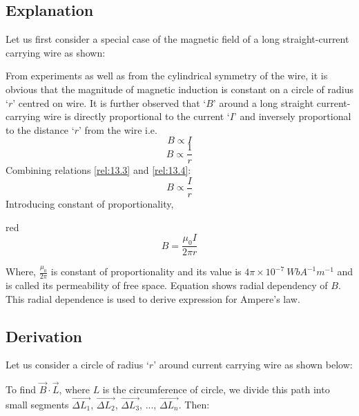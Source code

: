 \subsection*{Explanation}
Let us first consider a special case of the magnetic field of a
long straight-current carrying wire as shown:

From experiments as well as from the cylindrical symmetry of the wire, it is obvious that the magnitude of magnetic induction is constant on
a circle of radius ‘$r$’ centred on wire. It is further observed that ‘$B$’
around a long straight current-carrying wire is directly proportional
to the current ‘$I$’ and inversely proportional to the distance ‘$r$’ from
the wire i.e.
\begin{equation}\label{rel:13.3}
    B \propto I 
\end{equation}
\begin{equation}\label{rel:13.4}
    B \propto \frac{1}{r} 
\end{equation}
Combining relations \ref{rel:13.3} and \ref{rel:13.4}:
\begin{equation}\nonumber
    B \propto \frac{I}{r}
\end{equation}
Introducing constant of proportionality,
\begin{mybox}{red}{}
\begin{equation}\label{eq:13.5}
    B = \frac{\mu_{0}I}{2\pi r}
\end{equation}
\end{mybox}
Where, $\frac{\mu_{0}}{2\pi}$ is constant of proportionality and its value is $4\pi\times10^{-7}\:WbA^{-1}m^{-1}$ and is called its permeability of free space.
Equation   shows radial dependency of $B$. This radial dependence is used to derive expression for Ampere’s law.
\subsection*{Derivation}
Let us consider a circle of radius ‘$r$’ around current carrying wire as shown below:

To find $\vec{B} \cdot \vec{L}$, where $L$ is the circumference of circle, we divide this path into small segments $\vec{\Delta{L_{1}}}$, $\vec{\Delta{L_{2}}}$, $\vec{\Delta{L_{3}}}$, ..., $\vec{\Delta{L_{n}}}$. Then:

